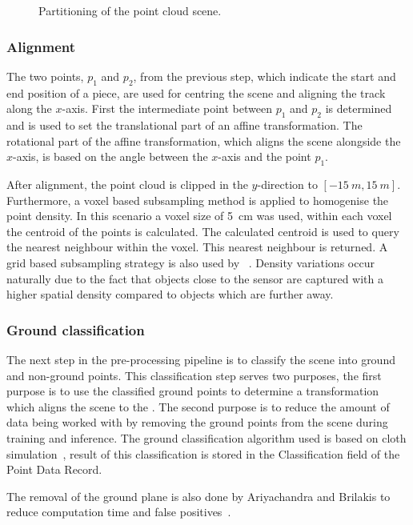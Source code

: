 \begin{figure}[ht]
    \centering
    
    \caption{Partitioning of the point cloud scene.}
    \label{fig:objdet:partitioning}
\end{figure}

\subsubsection{Alignment}
The two points, \(p_1\) and \(p_2\), from the previous step, which indicate the start and end position of a piece, are used for centring the scene and aligning the track along the \(x\)-axis. First the intermediate point between \(p_1\) and \(p_2\) is determined and is used to set the translational part of an affine transformation. The rotational part of the affine transformation, which aligns the scene alongside the \(x\)-axis, is based on the angle between the \(x\)-axis and the point \(p_1\).

After alignment, the point cloud is clipped in the \(y\)-direction to $[-15~m,15~m]$. Furthermore, a voxel based subsampling method is applied to homogenise the point density. In this scenario a voxel size of 5~cm was used, within each voxel the centroid of the points is calculated. The calculated centroid is used to query the nearest neighbour within the voxel. This nearest neighbour is returned. A grid based subsampling strategy is also used by \citeauthor{grandio2022point}~\cite{grandio2022point}. Density variations occur naturally due to the fact that objects close to the sensor are captured with a higher spatial density compared to objects which are further away.

\subsubsection{Ground classification}
The next step in the pre-processing pipeline is to classify the scene into ground and non-ground points. This classification step serves two purposes, the first purpose is to use the classified ground points to determine a transformation which aligns the scene to the \xyplane{}. The second purpose is to reduce the amount of data being worked with by removing the ground points from the scene during training and inference. The ground classification algorithm used is based on cloth simulation~\cite{csf.16}, result of this classification is stored in the Classification field of the Point Data Record.

The removal of the ground plane is also done by Ariyachandra and Brilakis to reduce computation time and false positives~\cite{ariyachandra2020digital}.


